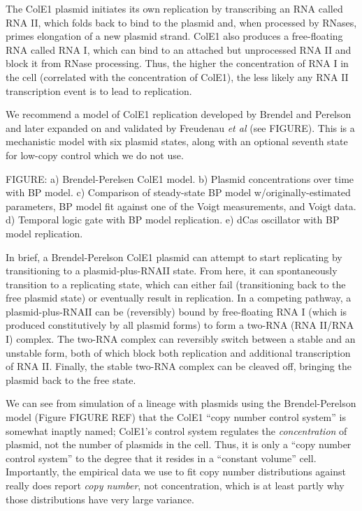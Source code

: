 \documentclass[preprint,12pt]{elsarticle}
\begin{document}
The ColE1 plasmid initiates its own replication by transcribing an RNA called RNA II, which folds back to bind to the plasmid and, when processed by RNases, primes elongation of a new plasmid strand. ColE1 also produces a free-floating RNA called RNA I, which can bind to an attached but unprocessed RNA II and block it from RNase processing. Thus, the higher the concentration of RNA I in the cell (correlated with the concentration of ColE1), the less likely any RNA II transcription event is to lead to replication.

We recommend a model of ColE1 replication developed by Brendel and Perelson \cite{Brendel1993} and later expanded on and validated by Freudenau \emph{et al} \cite{Freudenau2015} (see FIGURE). This is a mechanistic model with six plasmid states, along with an optional seventh state for low-copy control which we do not use. 

\vspace{.5in}
FIGURE: a) Brendel-Perelsen ColE1 model. b) Plasmid concentrations over time with BP model. c) Comparison of steady-state BP model w/originally-estimated parameters, BP model fit against one of the Voigt measurements, and Voigt data. d) Temporal logic gate with BP model replication. e) dCas oscillator with BP model replication. 
\vspace{.5in} 

In brief, a Brendel-Perelson ColE1 plasmid can attempt to start replicating by transitioning to a plasmid-plus-RNAII state. From here, it can spontaneously transition to a replicating state, which can either fail (transitioning back to the free plasmid state) or eventually result in replication. In a competing pathway, a plasmid-plus-RNAII can be (reversibly) bound by free-floating RNA I (which is produced constitutively by all plasmid forms) to form a two-RNA (RNA II/RNA I) complex. The two-RNA complex can reversibly switch between a stable and an unstable form, both of which block both replication and additional transcription of RNA II. Finally, the stable two-RNA complex can be cleaved off, bringing the plasmid back to the free state. 

We can see from simulation of a lineage with plasmids using the Brendel-Perelson model (Figure FIGURE REF) that the ColE1 ``copy number control system'' is somewhat inaptly named; ColE1's control system regulates the \emph{concentration} of plasmid, not the number of plasmids in the cell. Thus, it is only a ``copy number control system'' to the degree that it resides in a ``constant volume'' cell. Importantly, the empirical data we use to fit copy number distributions against really does report \emph{copy number}, not concentration, which is at least partly why those distributions have very large variance. 
\end{document}
